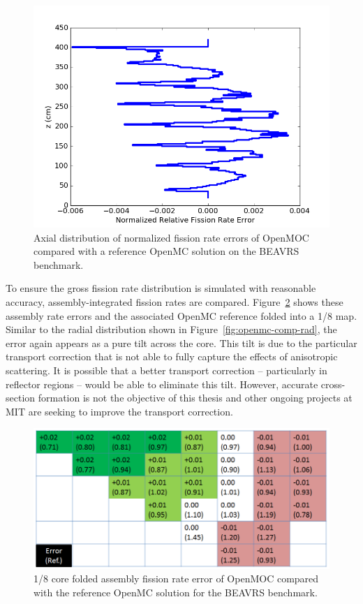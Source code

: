 \documentclass[12pt,twoside]{mitthesis-exec}
\begin{document}
\begin{figure}[ht!]
	\centering
	\includegraphics[width=0.8\linewidth]{figures/results/full-core/axial_diff_v_openmc.png}
	\caption{Axial distribution of normalized fission rate errors of OpenMOC compared with a reference OpenMC solution on the BEAVRS benchmark.}
	\label{fig:openmc-comp-ax}
\end{figure}


To ensure the gross fission rate distribution is simulated with reasonable accuracy, assembly-integrated fission rates are compared. Figure~\ref{fig:assembly-rr} shows these assembly rate errors and the associated OpenMC reference folded into a 1/8 map. Similar to the radial distribution shown in Figure~\ref{fig:openmc-comp-rad}, the error again appears as a pure tilt across the core. This tilt is due to the particular transport correction that is not able to fully capture the effects of anisotropic scattering. It is possible that a better transport correction -- particularly in reflector regions -- would be able to eliminate this tilt. However, accurate cross-section formation is not the objective of this thesis and other ongoing projects at MIT are seeking to improve the transport correction.

\begin{figure}[ht!]
	\centering
	\includegraphics[width=\linewidth]{figures/results/full-core/folded-1-8-core-assembly-rr.png}
	\caption{1/8 core folded assembly fission rate error of OpenMOC compared with the reference OpenMC solution for the BEAVRS benchmark.}
	\label{fig:assembly-rr}
\end{figure}
\end{document}
